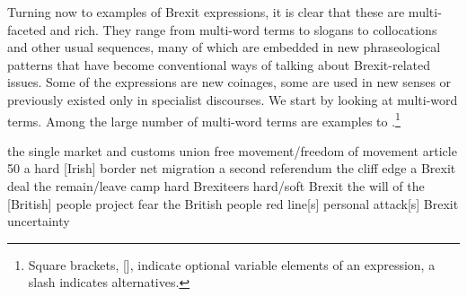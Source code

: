 \documentclass[output=paper]{langscibook}
\begin{document}
Turning now to examples of Brexit expressions, it is clear that these are multi-faceted and rich. They range from multi-word terms to slogans to collocations and other usual sequences, many of which are embedded in new phraseological patterns that have become conventional ways of talking about Brexit-related issues. Some of the expressions are new coinages, some are used in new senses or previously existed only in specialist discourses. We start by looking at multi-word terms. Among the large number of multi-word terms are examples  to .\footnote{Square brackets, [], indicate optional variable elements of an expression, a slash indicates alternatives.}

\ea the single market and customs union\label{ex:buerki:1}
\ex{} free movement\slash freedom of movement\label{ex:buerki:2}
\ex\relax [trigger] article 50\label{ex:buerki:3}
\ex{} a hard [Irish] border\label{ex:buerki:4}
\ex{} net migration\label{ex:buerki:5}
\ex\relax a second referendum\label{ex:buerki:6}
\ex\relax the cliff edge\label{ex:buerki:7}
\ex\relax a Brexit deal\label{ex:buerki:8}
\ex\relax the remain\slash leave camp\label{ex:buerki:9}
\ex\relax hard Brexiteers\label{ex:buerki:10}
\ex\relax hard\slash soft Brexit\label{ex:buerki:11}
\ex\relax the will of the [British] people\label{ex:buerki:12}
\ex\relax project fear\label{ex:buerki:13}
\ex\relax the British people\label{ex:buerki:14}
\ex\relax red line[s]\label{ex:buerki:15}
\ex\relax personal attack[s]\label{ex:buerki:16}
\ex\relax Brexit uncertainty\label{ex:buerki:17}
\z
\end{document}
